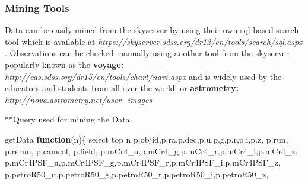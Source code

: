 \documentclass[11pt]{article}
\newenvironment{Shaded}{}{}
\newcommand{\KeywordTok}[1]{\textcolor[rgb]{0.00,0.44,0.13}{\textbf{{#1}}}}
\newcommand{\NormalTok}[1]{{#1}}
\newcommand{\VariableTok}[1]{\textcolor[rgb]{0.10,0.09,0.49}{{#1}}}
\newcommand{\OperatorTok}[1]{\textcolor[rgb]{0.40,0.40,0.40}{{#1}}}
\newcommand{\AttributeTok}[1]{\textcolor[rgb]{0.49,0.56,0.16}{{#1}}}
\begin{document}
\subsubsection{Mining Tools}\label{mining-tools}

Data can be easily mined from the skyserver by using their own sql based
search tool which is available at
\emph{https://skyserver.sdss.org/dr12/en/tools/search/sql.aspx }.
Observations can be checked manually using another tool from the
skyserver popularly known as the \textbf{voyage:}
\emph{http://cas.sdss.org/dr15/en/tools/chart/navi.aspx} and is widely
used by the educators and students from all over the world! or
\textbf{astrometry:} \emph{http://nova.astrometry.net/user\_images}

    **Query used for mining the Data

\begin{Shaded}
\begin{Highlighting}[]
\NormalTok{getData }\KeywordTok{function}\NormalTok{(n)}\OperatorTok{\{}
\NormalTok{select top n}
 \VariableTok{p}\NormalTok{.}\AttributeTok{objid}\OperatorTok{,}\VariableTok{p}\NormalTok{.}\AttributeTok{ra}\OperatorTok{,}\VariableTok{p}\NormalTok{.}\AttributeTok{dec}\OperatorTok{,}\VariableTok{p}\NormalTok{.}\AttributeTok{u}\OperatorTok{,}\VariableTok{p}\NormalTok{.}\AttributeTok{g}\OperatorTok{,}\VariableTok{p}\NormalTok{.}\AttributeTok{r}\OperatorTok{,}\VariableTok{p}\NormalTok{.}\AttributeTok{i}\OperatorTok{,}\VariableTok{p}\NormalTok{.}\AttributeTok{z}\OperatorTok{,}
 \VariableTok{p}\NormalTok{.}\AttributeTok{run}\OperatorTok{,} \VariableTok{p}\NormalTok{.}\AttributeTok{rerun}\OperatorTok{,} \VariableTok{p}\NormalTok{.}\AttributeTok{camcol}\OperatorTok{,} \VariableTok{p}\NormalTok{.}\AttributeTok{field}\OperatorTok{,}
 \VariableTok{p}\NormalTok{.}\AttributeTok{mCr4_u}\OperatorTok{,}\VariableTok{p}\NormalTok{.}\AttributeTok{mCr4_g}\OperatorTok{,}\VariableTok{p}\NormalTok{.}\AttributeTok{mCr4_r}\OperatorTok{,}\VariableTok{p}\NormalTok{.}\AttributeTok{mCr4_i}\OperatorTok{,}\VariableTok{p}\NormalTok{.}\AttributeTok{mCr4_z}\OperatorTok{,}
 \VariableTok{p}\NormalTok{.}\AttributeTok{mCr4PSF_u}\OperatorTok{,}\VariableTok{p}\NormalTok{.}\AttributeTok{mCr4PSF_g}\OperatorTok{,}\VariableTok{p}\NormalTok{.}\AttributeTok{mCr4PSF_r}\OperatorTok{,}\VariableTok{p}\NormalTok{.}\AttributeTok{mCr4PSF_i}\OperatorTok{,}\VariableTok{p}\NormalTok{.}\AttributeTok{mCr4PSF_z}\OperatorTok{,}
 \VariableTok{p}\NormalTok{.}\AttributeTok{petroR50_u}\OperatorTok{,}\VariableTok{p}\NormalTok{.}\AttributeTok{petroR50_g}\OperatorTok{,}\VariableTok{p}\NormalTok{.}\AttributeTok{petroR50_r}\OperatorTok{,}\VariableTok{p}\NormalTok{.}\AttributeTok{petroR50_i}\OperatorTok{,}\VariableTok{p}\NormalTok{.}\AttributeTok{petroR50_z}\OperatorTok{,}

\end{Highlighting}
\end{Shaded}
\end{document}
